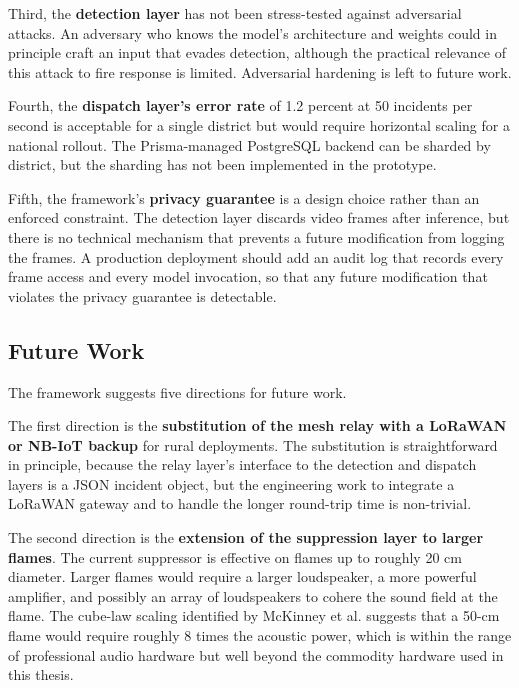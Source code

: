 Third, the \textbf{detection layer} has not been stress-tested against adversarial attacks. An adversary who knows the model's architecture and weights could in principle craft an input that evades detection, although the practical relevance of this attack to fire response is limited. Adversarial hardening is left to future work.

Fourth, the \textbf{dispatch layer's error rate} of 1.2 percent at 50 incidents per second is acceptable for a single district but would require horizontal scaling for a national rollout. The Prisma-managed PostgreSQL backend can be sharded by district, but the sharding has not been implemented in the prototype.

Fifth, the framework's \textbf{privacy guarantee} is a design choice rather than an enforced constraint. The detection layer discards video frames after inference, but there is no technical mechanism that prevents a future modification from logging the frames. A production deployment should add an audit log that records every frame access and every model invocation, so that any future modification that violates the privacy guarantee is detectable.

\subsection{Future Work}

The framework suggests five directions for future work.

The first direction is the \textbf{substitution of the mesh relay with a LoRaWAN or NB-IoT backup} for rural deployments. The substitution is straightforward in principle, because the relay layer's interface to the detection and dispatch layers is a JSON incident object, but the engineering work to integrate a LoRaWAN gateway and to handle the longer round-trip time is non-trivial.

The second direction is the \textbf{extension of the suppression layer to larger flames}. The current suppressor is effective on flames up to roughly 20 cm diameter. Larger flames would require a larger loudspeaker, a more powerful amplifier, and possibly an array of loudspeakers to cohere the sound field at the flame. The cube-law scaling identified by McKinney et al. \cite{mckinney2019sonic} suggests that a 50-cm flame would require roughly 8 times the acoustic power, which is within the range of professional audio hardware but well beyond the commodity hardware used in this thesis.

